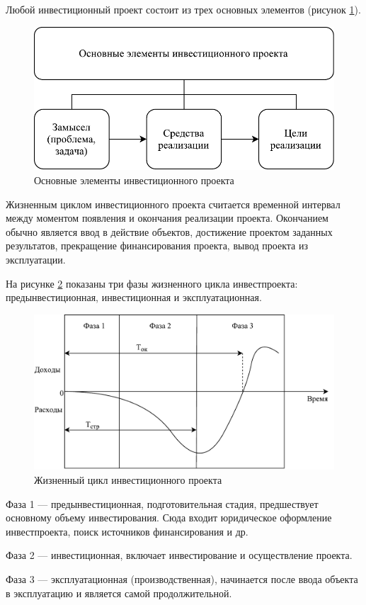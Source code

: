 Любой инвестиционный проект состоит из трех основных элементов (рисунок \ref{fig:element}).

\begin{figure}[!ht]
	\centering
	\includegraphics[width=0.7\linewidth]{element}
	\caption{Основные элементы инвестиционного проекта}
	\label{fig:element}
\end{figure}

Жизненным циклом инвестиционного проекта считается временной интервал между моментом появления и окончания реализации проекта. Окончанием обычно является ввод в действие объектов, достижение проектом заданных результатов, прекращение финансирования проекта, вывод проекта из эксплуатации.

На рисунке \ref{fig:prcycle} показаны три фазы жизненного цикла инвестпроекта: предынвестиционная, инвестиционная и эксплуатационная.

\begin{figure}[!hb]
	\centering
	\includegraphics[width=0.85\linewidth]{prcycle}
	\caption{Жизненный цикл инвестиционного проекта}
	\label{fig:prcycle}
\end{figure}

Фаза 1 --- предынвестиционная, подготовительная стадия, предшествует основному объему инвестирования. Сюда входит юридическое оформление инвестпроекта, поиск источников финансирования и др.

Фаза 2 --- инвестиционная, включает инвестирование и осуществление проекта.

Фаза 3 --- эксплуатационная (производственная), начинается после ввода объекта в эксплуатацию и является самой продолжительной.

